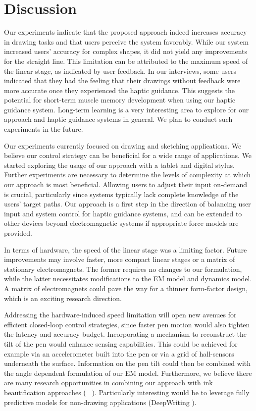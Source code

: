 \section{Discussion}
Our experiments indicate that the proposed approach indeed increases accuracy in drawing tasks and that users perceive the system favorably. 
While our system increased users' accuracy for complex shapes, it did not yield any improvements for the straight line. 
This limitation can be attributed to the maximum speed of the linear stage, as indicated by user feedback.
In our interviews, some users indicated that they had the feeling that their drawings without feedback were more accurate once they experienced the haptic guidance.
This suggests the potential for short-term muscle memory development when using our haptic guidance system.
Long-term learning is a very interesting area to explore for our approach and haptic guidance systems in general. We plan to conduct such experiments in the future.
 
Our experiments currently focused on drawing and sketching applications.
We believe our control strategy can be beneficial for a wide range of applications.
We started exploring the usage of our approach with a tablet and digital stylus.
Further experiments are necessary to determine the levels of complexity at which our approach is most beneficial.
Allowing users to adjust their input on-demand is crucial, particularly since systems typically lack complete knowledge of the users' target paths.
Our approach is a first step in the direction of balancing user input and system control for haptic guidance systems, and can be extended to other devices beyond electromagnetic systems if appropriate force models are provided.

In terms of hardware, the speed of the linear stage was a limiting factor. Future improvements may involve faster, more compact linear stages or a matrix of stationary electromagnets. The former requires no changes to our formulation, while the latter necessitates modifications to the EM model and dynamics model. A matrix of electromagnets could pave the way for a thinner form-factor design, which is an exciting research direction.

Addressing the hardware-induced speed limitation will open new avenues for efficient closed-loop control strategies, since faster pen motion would also tighten the latency and accuracy budget. 
Incorporating a mechanism to reconstruct the tilt of the pen would enhance sensing capabilities.
This could be achieved for example via an accelerometer built into the pen or via a grid of hall-sensors underneath the surface. 
Information on the pen tilt could then be combined with the angle dependent formulation of our EM model. 
Furthermore, we believe there are many research opportunities in combining our approach with ink beautification approaches (\eg~ \cite{simo2016learning,simo2018mastering,xing2015autocomplete}). 
Particularly interesting would be to leverage fully predictive models for non-drawing applications (\eg DeepWriting \cite{Aksan:2018:DeepWriting}). 

